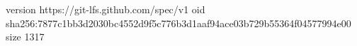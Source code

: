 version https://git-lfs.github.com/spec/v1
oid sha256:7877c1bb3d2030bc4552d9f5c776b3d1aaf94ace03b729b55364f04577994e00
size 1317
